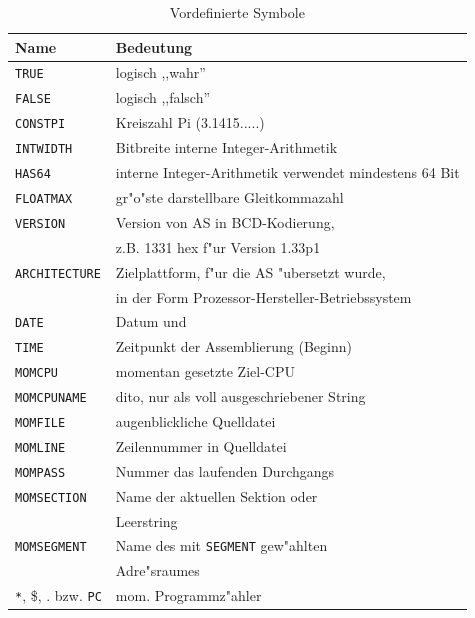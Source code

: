 \documentclass[12pt,a4paper,twoside]{report}
\newcommand{\tty}[1]{{\tt #1}}
\newcommand{\asname}{AS}
\begin{document}
\begin{table}[p]
\begin{center}\begin{tabular}{|l|l|}
\hline
Name             & Bedeutung \\
\hline
\hline
\tty{TRUE}             & logisch ,,wahr'' \\
\tty{FALSE}            & logisch ,,falsch'' \\
\tty{CONSTPI}          & Kreiszahl Pi (3.1415.....) \\
\tty{INTWIDTH}         & Bitbreite interne Integer-Arithmetik \\
\tty{HAS64}            & interne Integer-Arithmetik verwendet mindestens 64 Bit \\
\tty{FLOATMAX}         & gr"o"ste darstellbare Gleitkommazahl \\
\tty{VERSION}          & Version von \asname{} in BCD-Kodierung, \\
                       & z.B. 1331 hex f"ur Version 1.33p1 \\
\tty{ARCHITECTURE}     & Zielplattform, f"ur die \asname{} "ubersetzt wurde, \\
                       & in der Form Prozessor-Hersteller-Betriebssystem \\
\tty{DATE}             & Datum und \\
\tty{TIME}             & Zeitpunkt der Assemblierung (Beginn) \\
\tty{MOMCPU}           & momentan gesetzte Ziel-CPU \\
\tty{MOMCPUNAME}       & dito, nur als voll ausgeschriebener String \\
\tty{MOMFILE}          & augenblickliche Quelldatei \\
\tty{MOMLINE}          & Zeilennummer in Quelldatei \\
\tty{MOMPASS}          & Nummer das laufenden Durchgangs \\
\tty{MOMSECTION}       & Name der aktuellen Sektion oder \\
                       & Leerstring \\
\tty{MOMSEGMENT}       & Name des mit \tty{SEGMENT} gew"ahlten \\
                       & Adre"sraumes \\
\verb!*!, \$, . bzw. \tty{PC} & mom. Programmz"ahler \\
\hline
\end{tabular}\end{center}
\caption{Vordefinierte Symbole\label{TabPredefined}}
\end{table}
\end{document}
